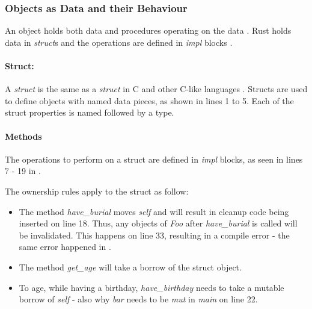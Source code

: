 \subsubsection{Objects as Data and their Behaviour}
An object holds both data and procedures operating on the data \cite{meyer_97_01,stefik_85_01,gamma_94_01,malik_09_01}.
Rust holds data in \textit{struct}s and the operations are defined in \textit{impl} blocks \cite{klabnik_2019_01}.

\paragraph{Struct:}
A \textit{struct} is the same as a \textit{struct} in C \cite{stroustrup_13_01} and other C-like languages \cite{robinson_04_01,savitch_15_01,malik_09_01}.
Structs are used to define objects with named data pieces, as shown in  lines 1 to 5.
Each of the struct properties is named followed by a type.

\paragraph{Methods}
The operations to perform on a struct are defined in \textit{impl} blocks, as seen in lines 7 - 19 in .

The ownership rules apply to the struct as follow:
\begin{itemize}
	\item The method \textit{have\_burial} moves \textit{self} and will result in cleanup code being inserted on line 18.
	      Thus, any objects of \textit{Foo} after \textit{have\_burial} is called will be invalidated.
	      This happens on line 33, resulting in a compile error - the same error happened in .
	\item The method \textit{get\_age} will take a borrow of the struct object.
	\item To age, while having a birthday, \textit{have\_birthday} needs to take a mutable borrow of \textit{self} - also why \textit{bar} needs to be \textit{mut} in \textit{main} on line 22.
\end{itemize}

\addtocounter{footnote}{1}

